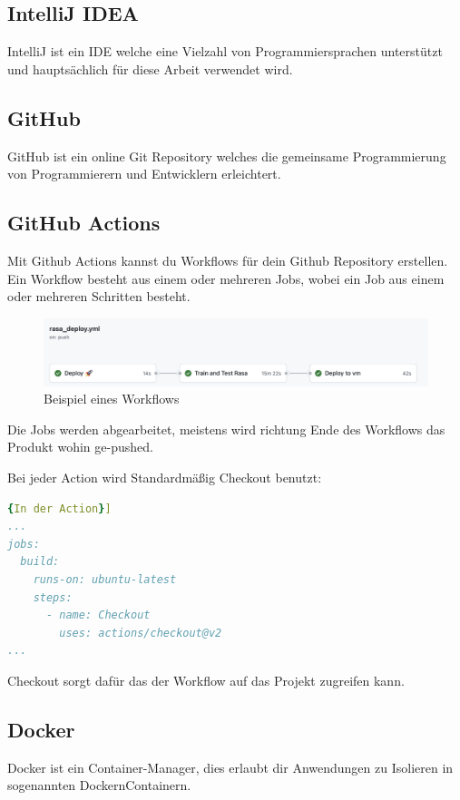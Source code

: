 \subsection{IntelliJ IDEA}
IntelliJ ist ein IDE welche eine Vielzahl von Programmiersprachen unterstützt und hauptsächlich für diese Arbeit verwendet wird.

\subsection{GitHub}
GitHub ist ein online Git Repository welches die gemeinsame Programmierung von Programmierern und Entwicklern erleichtert.

\subsection{GitHub Actions}\label{subsec:github-actions}
Mit Github Actions kannst du Workflows für dein Github Repository erstellen.
Ein Workflow besteht aus einem oder mehreren Jobs, wobei ein Job aus einem oder mehreren Schritten besteht.

\begin{figure}[hbt!]
    \centering
    \includegraphics[scale=0.5]{pics/ghActions}
    \caption{Beispiel eines Workflows}
    \label{fig:impl:ghActions}
\end{figure}

Die Jobs werden abgearbeitet, meistens wird richtung Ende des Workflows das Produkt wohin ge-pushed.

Bei jeder Action wird Standardmäßig Checkout benutzt:

\begin{lstlisting}[language=yaml,label={lst:checkout},caption={In der Action}]{In der Action}]
...
jobs:
  build:
    runs-on: ubuntu-latest
    steps:
      - name: Checkout
        uses: actions/checkout@v2
...
\end{lstlisting}

Checkout sorgt dafür das der Workflow auf das Projekt zugreifen kann.

\subsection{Docker}
Docker ist ein Container-Manager, dies erlaubt dir Anwendungen zu Isolieren in sogenannten DockernContainern.

